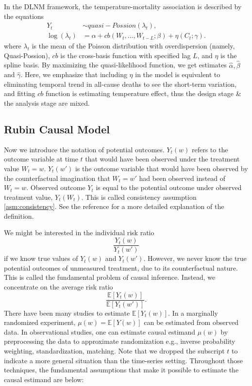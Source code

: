 \documentclass[12pt]{article}
\begin{document}
In the DLNM framework,
the temperature-mortality association is described by the equations
\[
	\begin{split}
		Y_t &\sim quasi-Possion(\lambda_t), \\
		\log(\lambda_t) &= \alpha + cb(W_t, \dots, W_{t-L};\beta) + \eta(C_t; \gamma).
	\end{split}
\]
where $\lambda_t$ is the mean of 
the Poisson distribution with overdispersion (namely, Quasi-Possion\cite{quasipoisson}),
$cb$ is the cross-basis function with specified lag $L$,
and $\eta$ is the spline basis.
By maximizing the quasi-likelihood function, 
we get estimates $\hat{\alpha}, \hat{\beta}$ and $\hat{\gamma}$.
Here, we emphasize that 
including $\eta$ in the model is equivalent to eliminating temporal trend in all-cause deaths
to see the short-term variation,
and fitting $cb$ function is estimating temperature effect,
thus the design stage \& the analysis stage are mixed.


\subsection{Rubin Causal Model}
\label{section:rcm}

Now we introduce the notation of potential outcomes.
$Y_t(w)$ refers to the outcome variable at time $t$
that would have been observed under the treatment value $W_t = w$.
$Y_t(w')$ is the outcome variable that would have been observed by the counterfactual imagination
that $W_t = w'$ had been observed instead of $W_t = w$.
Observed outcome $Y_t$ is equal to the potential outcome under observed treatment value, $Y_t(W_t)$.
This is called consistency assumption \ref{asm:consistency}.
See the reference\cite{whatif2020} for a more detailed explanation of the definition.

We might be interested in the individual risk ratio
\[
	\frac{Y_t(w)}{Y_t(w')}
\]
if we know true values of $Y_t(w)$ and $Y_t(w')$.
However, we never know the true potential outcomes of unmeasured treatment, 
due to its counterfactual nature.
This is called the fundamental problem of causal inference\cite{holland1986}.
Instead, we concentrate on the average risk ratio
\[
	\frac{\mathbb{E}\left[ Y_t(w) \right]}{\mathbb{E}\left[ Y_t(w') \right]}.
\]
There have been many studies to estimate $\mathbb{E}[Y_t(w)]$.
In a marginally randomized experiment, 
$\mu(w) = \mathbb{E}[Y(w)]$ can be estimated from observed data\cite{rubin1974}.
In observational studies, 
one can estimate causal estimand $\mu(w)$ by preprocessing the data to approximate randomization 
e.g., inverse probability weighting, standardization, matching\cite{rosenbaum1983}.
Note that we dropped the subscript $t$ to indicate a more general situation than the time-series setting.
Throughout those techniques, 
the fundamental assumptions that make it possible to estimate the causal estimand are below:
\end{document}

